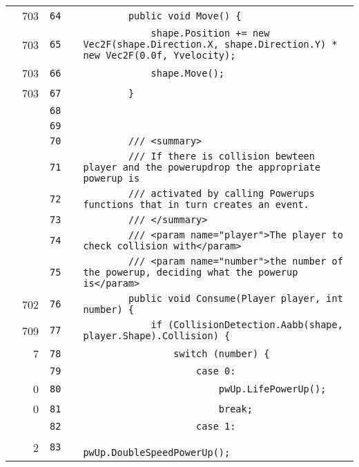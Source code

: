 \documentclass[a4paper,landscape,10pt]{article}
\begin{document}
\begin{longtable}[l]{lrrll}
\cellcolor{green} & 703 & \verb~64~ & & \verb~        public void Move() {~\\
\cellcolor{green} & 703 & \verb~65~ & & \verb~            shape.Position += new Vec2F(shape.Direction.X, shape.Direction.Y) * new Vec2F(0.0f, Yvelocity);~\\
\cellcolor{green} & 703 & \verb~66~ & & \verb~            shape.Move();~\\
\cellcolor{green} & 703 & \verb~67~ & & \verb~        }~\\
\cellcolor{gray} &  & \verb~68~ & & \verb~~\\
\cellcolor{gray} &  & \verb~69~ & & \verb~~\\
\cellcolor{gray} &  & \verb~70~ & & \verb~        /// <summary>~\\
\cellcolor{gray} &  & \verb~71~ & & \verb~        /// If there is collision bewteen player and the powerupdrop the appropriate powerup is~\\
\cellcolor{gray} &  & \verb~72~ & & \verb~        /// activated by calling Powerups functions that in turn creates an event.~\\
\cellcolor{gray} &  & \verb~73~ & & \verb~        /// </summary>~\\
\cellcolor{gray} &  & \verb~74~ & & \verb~        /// <param name="player">The player to check collision with</param>~\\
\cellcolor{gray} &  & \verb~75~ & & \verb~        /// <param name="number">the number of the powerup, deciding what the powerup is</param>~\\
\cellcolor{green} & 702 & \verb~76~ & & \verb~        public void Consume(Player player, int number) {~\\
\cellcolor{green} & 709 & \verb~77~ & & \verb~            if (CollisionDetection.Aabb(shape, player.Shape).Collision) {~\\
\cellcolor{orange} & 7 & \verb~78~ & & \verb~                switch (number) {~\\
\cellcolor{gray} &  & \verb~79~ & & \verb~                    case 0:~\\
\cellcolor{red} & 0 & \verb~80~ & & \verb~                        pwUp.LifePowerUp();~\\
\cellcolor{red} & 0 & \verb~81~ & & \verb~                        break;~\\
\cellcolor{gray} &  & \verb~82~ & & \verb~                    case 1:~\\
\cellcolor{green} & 2 & \verb~83~ & & \verb~                        pwUp.DoubleSpeedPowerUp();~\\

\end{longtable}
\end{document}
